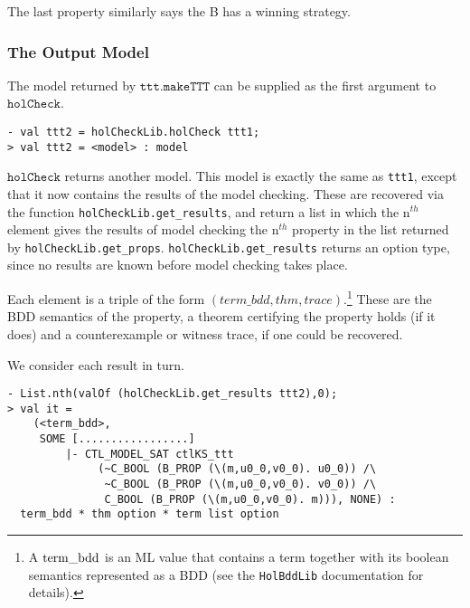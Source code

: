 The last property similarly says the B has a winning strategy.

\subsubsection{The Output Model}

The model returned by \(\mathtt{ttt.makeTTT}\) can be supplied as the first argument to \(\mathtt{holCheck}\).

\begin{session}\begin{verbatim}
- val ttt2 = holCheckLib.holCheck ttt1;
> val ttt2 = <model> : model
\end{verbatim}\end{session}

\(\mathtt{holCheck}\) returns another model. This model is exactly the same as \texttt{ttt1}, except that it now contains the results of the model checking. These are recovered via the function \texttt{holCheckLib.get\_results}, and return a list in which the n\({}^{th}\) element gives the results of model checking the n\({}^{th}\) property in the list returned by \texttt{holCheckLib.get\_props}. \texttt{holCheckLib.get\_results} returns an option type, since no results are known before model checking takes place.

Each element is a triple of the form \( (term\_bdd,thm,trace) \).\footnote{A \(\textup{term\_bdd}\) is an ML value that contains a \HOL{} term together with its boolean semantics represented as a BDD (see the \texttt{HolBddLib} documentation for details).} These are the BDD semantics of the property, a theorem certifying the property holds (if it does) and a counterexample or witness trace, if one could be recovered.

We consider each result in turn.

\begin{session}\begin{verbatim}
- List.nth(valOf (holCheckLib.get_results ttt2),0);
> val it =
    (<term_bdd>,
     SOME [.................]
         |- CTL_MODEL_SAT ctlKS_ttt
              (~C_BOOL (B_PROP (\(m,u0_0,v0_0). u0_0)) /\
               ~C_BOOL (B_PROP (\(m,u0_0,v0_0). v0_0)) /\
               C_BOOL (B_PROP (\(m,u0_0,v0_0). m))), NONE) :
  term_bdd * thm option * term list option
\end{verbatim}\end{session}

